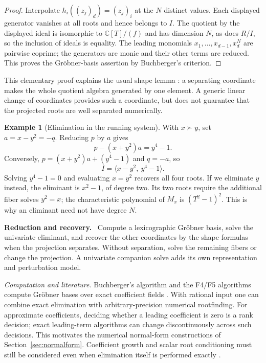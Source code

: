 \documentclass[12pt]{article}
\def\C{\mathbb{C}}
\theoremstyle{definition}
\newtheorem{example}[theorem]{Example}
\theoremstyle{remark}
\newenvironment{reduction}
  {\par\medskip\noindent\textbf{Reduction and recovery.}\ }
  {\par\medskip}
\begin{document}
\begin{proof}
Interpolate $h_i((z_j)_d)=(z_j)_i$ at the $N$ distinct values. Each displayed generator
vanishes at all roots and hence belongs to $I$. The quotient by the displayed ideal
is isomorphic to $\C[T]/(f)$ and has dimension $N$, as does $R/I$, so the inclusion of
ideals is equality. The leading monomials $x_1,\ldots,x_{d-1},x_d^N$ are pairwise
coprime; the generators are monic and their other terms are reduced. This proves
the Gr\"obner-basis assertion by Buchberger's criterion.
\end{proof}

This elementary proof explains the usual shape lemma
\cite{gianni1989algebraic,cox2005using}: a separating coordinate makes the whole
quotient algebra generated by one element. A generic linear change of coordinates
provides such a coordinate, but does not guarantee that the projected roots are
well separated numerically.

\begin{example}[Elimination in the running system]\label{ex:shape}
With $x\succ y$, set $a=x-y^2=-q$. Reducing $p$ by $a$ gives
\[
  p-(x+y^2)a=y^4-1.
\]
Conversely, $p=(x+y^2)a+(y^4-1)$ and $q=-a$, so
\[
  I=\langle x-y^2,\ y^4-1\rangle.
\]
Solving $y^4-1=0$ and evaluating $x=y^2$ recovers all four roots. If we eliminate
$y$ instead, the eliminant is $x^2-1$, of degree two. Its two roots require the
additional fiber solves $y^2=x$; the characteristic polynomial of $M_x$ is
$(T^2-1)^2$. This is why an eliminant need not have degree $N$.
\end{example}

\begin{reduction}
Compute a lexicographic Gr\"obner basis, solve the univariate eliminant, and recover
the other coordinates by the shape formulas when the projection separates.
Without separation, solve the remaining fibers or change the projection. A
univariate companion solve adds its own representation and perturbation model.
\end{reduction}

\emph{Computation and literature.} Buchberger's algorithm and the F4/F5 algorithms
compute Gr\"obner bases over exact coefficient fields
\cite{buchberger2006algorithm,faugere1999f4,faugere2002f5}. With rational input one can
combine exact elimination with arbitrary-precision numerical rootfinding.
For approximate coefficients, deciding whether a leading coefficient is zero is a
rank decision; exact leading-term algorithms can change discontinuously across such
decisions. This motivates the numerical normal-form constructions of
Section~\ref{sec:normalform}. Coefficient growth and scalar root conditioning must
still be considered even when elimination itself is performed exactly
\cite{graf2026numerical}.
\end{document}
